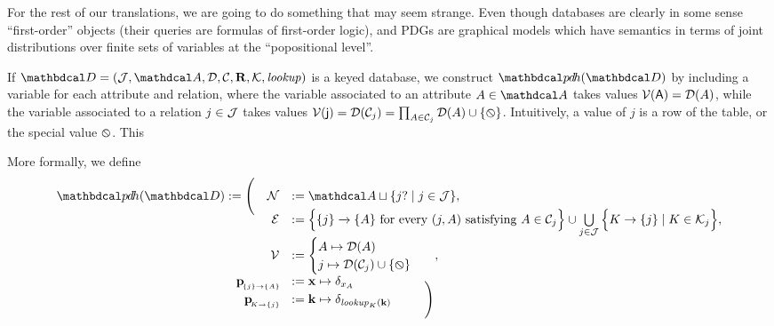\documentclass[the-pdg-manual.tex]{subfiles}
\begin{document}
\begin{defn}
	
\end{defn}

For the rest of our translations, we are going to do something that may seem strange. Even though databases are clearly in some sense ``first-order'' objects (their queries are formulas of first-order logic), and PDGs are graphical models which have semantics in terms of joint distributions over finite sets of variables at the ``popositional level''.


\begin{defn}\label{def:expanded-rel-translation}
    If $\D = (\Idx,\Attrs,\Doms,\Cols,\Rels,\Keys, \mathit{lookup})$ is a keyed database, we construct $\PDHof\D$ by 
    including a variable for each attribute and relation, where the variable associated to an attribute $A \in \Attrs$ takes values $\mathcal V(\mathsf{A}) = {\mathcal D}(A)$, while the variable associated to a relation $j \in \mathcal J$ takes values $\mathcal V(\mathsf{j}) = {\mathcal D}(\mathcal C_j) = \prod_{A \in \mathcal C_j}{\mathcal D}(A) \cup \{\varobslash\}$. Intuitively, a value of $j$ is a row of the table, or the special value $\varobslash$. This 
    
    More formally, we define
    \[ 
    \begin{array}{rl}%
        \PDHof{\D} := \Bigg(\quad	\N &:=  \Attrs \sqcup \{ j? \mid j \in \Idx\},
        \\[-0.5em]
        \Ed &:= \Big\{ \ed{}{\{j\}}{\{A\}} \text{ for every }(j,A)\text{ satisfying } A\in \Cols_j \Big\}
            \cup \bigcup\limits_{j \in \Idx}\Big\{ K \to \{ j \} \mid K \in \Keys_j\Big\},  
         \\[0.5em]
        \V &:= 
        \begin{cases}
            A \mapsto \Doms(A) \\
            j \mapsto \Doms(\Cols_j) \cup \{\none\}
        \end{cases}~~, %
        \\
        \bp[\{j\}\to\{A\}] &:= \mat x \mapsto \delta_{x_{A}}
        \\[-0.7em]
        \bp[K\to\{j\}] &:= \mat k \mapsto \delta_{\mathit{lookup}_K(\mat k)}~~\qquad \Bigg)

    \end{array} 
    \]
\end{defn}
\end{document}
